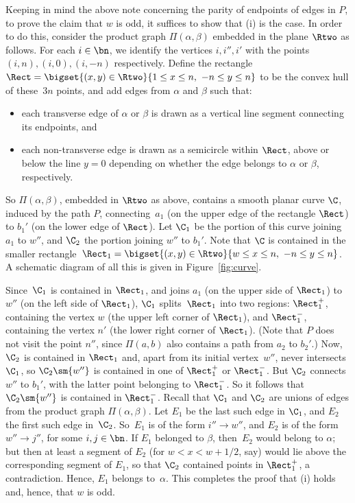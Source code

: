 Keeping in mind the above note concerning the parity of endpoints of edges in $P$, to prove the claim that $w$ is odd, it suffices to show that (i) is the case.  
%
In order to do this, consider the product graph $\Pi(\alpha,\beta)$ embedded in the plane $\Rtwo$ as follows.  For each $i\in\bn$, we identify the vertices $i,i'',i'$ with the points $(i,n),(i,0),(i,-n)$ respectively.  Define the rectangle $\Rect=\bigset{(x,y)\in\Rtwo}{1\leq x\leq n,\ -n\leq y\leq n}$ to be the convex hull of these~$3n$ points, and add edges from $\alpha$ and $\beta$ such that:
\begin{itemize}
\item each transverse edge of $\alpha$ or $\beta$ is drawn as a vertical line segment connecting its endpoints, and 
\item each non-transverse edge is drawn as a semicircle within $\Rect$, above or below the line $y=0$ depending on whether the edge belongs to $\alpha$ or $\beta$, respectively.
\end{itemize}
So $\Pi(\alpha,\beta)$, embedded in $\Rtwo$ as above, contains a smooth planar curve $\C$, induced by the path $P$, connecting~$a_1$ (on the upper edge of the rectangle $\Rect$) to $b_1'$ (on the lower edge of $\Rect$).  Let $\C_1$ be the portion of this curve joining $a_1$ to $w''$, and $\C_2$ the portion joining $w''$ to $b_1'$.  Note that $\C$ is contained in the smaller rectangle~${\Rect_1=\bigset{(x,y)\in\Rtwo}{w\leq x\leq n,\ -n\leq y\leq n}}$.  A schematic diagram of all this is given in Figure~\ref{fig:curve}.  

Since~$\C_1$ is contained in $\Rect_1$, and joins $a_1$ (on the upper side of $\Rect_1$) to $w''$ (on the left side of $\Rect_1$), $\C_1$ splits~$\Rect_1$ into two regions: $\Rect_1^+$, containing the vertex $w$ (the upper left corner of $\Rect_1$), and $\Rect_1^-$, containing the vertex $n'$ (the lower right corner of $\Rect_1$).  (Note that $P$ does not visit the point $n''$, since $\Pi(a,b)$ also contains a path from $a_2$ to $b_2'$.)  Now, $\C_2$ is contained in $\Rect_1$ and, apart from its initial vertex~$w''$, never intersects~$\C_1$, so $\C_2\sm\{w''\}$ is contained in one of $\Rect_1^+$ or $\Rect_1^-$.  But $\C_2$ connects $w''$ to $b_1'$, with the latter point belonging to $\Rect_1^-$.  So it follows that $\C_2\sm\{w''\}$ is contained in $\Rect_1^-$.  
%
Recall that $\C_1$ and $\C_2$ are unions of edges from the product graph $\Pi(\alpha,\beta)$.  Let $E_1$ be the last such edge in $\C_1$, and $E_2$ the first such edge in~$\C_2$.  So~$E_1$ is of the form $i''\to w''$, and $E_2$ is of the form $w''\to j''$, for some $i,j\in\bn$.  If $E_1$ belonged to $\beta$, then~$E_2$ would belong to $\alpha$; but then at least a segment of $E_2$ (for $w<x<w+1/2$, say) would lie above the corresponding segment of $E_1$, so that $\C_2$ contained points in $\Rect_1^+$, a contradiction.  Hence, $E_1$ belongs to~$\alpha$.  This completes the proof that (i) holds and, hence, that $w$ is odd.

